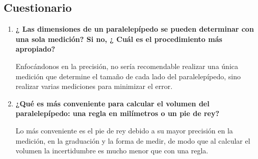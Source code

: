 \subsection{Cuestionario}
\begin{enumerate}
    \item \textbf{¿ Las dimensiones de un paralelepípedo se pueden determinar con una sola medición? Si no, ¿ Cuál es el procedimiento más apropiado?}
    
Enfocándonos en la precisión, no sería recomendable realizar una única medición que determine el tamaño de cada lado del paralelepípedo, sino realizar varias mediciones para minimizar el error.
    \item \textbf{¿Qué es más conveniente para calcular el volumen del paralelepípedo: una regla en milímetros o un pie de rey?}

    
Lo más conveniente es el pie de rey debido a su mayor precisión en la medición, en la graduación y la forma de medir, de modo que al calcular el volumen la incertidumbre es mucho menor que con una regla.

\end{enumerate}